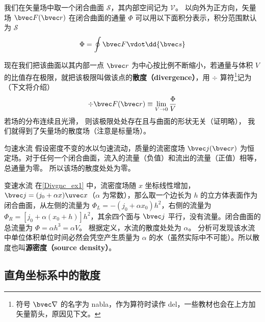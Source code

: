 

我们在矢量场中取一个闭合曲面 $\mathcal{S}$，其内部空间记为 $\mathcal{V}$。 以向外为正方向，矢量场 $\bvec F(\bvec r)$ 在闭合曲面的通量 $\Phi$ 可以用以下面积分表示，积分范围默认为 $\mathcal{S}$
\begin{equation}\label{Divgnc_eq1}
\Phi  = \oint \bvec F \vdot \dd{\bvec s}
\end{equation}

现在我们把该曲面以其内部一点 $\bvec r$ 为中心按比例不断缩小，若通量与体积 $V$ 的比值存在极限，就把该极限叫做该点的\textbf{散度（divergence）}，用 $\div$ 算符\footnote{符号 $\bvec\nabla$ 的名字为 nabla，作为算符时读作 del，一些教材也会在上方加矢量箭头，原因见下文。}记为（下文将介绍）
\begin{equation}\label{Divgnc_eq2}
\div \bvec F(\bvec r) \equiv \lim_{V \to 0} \frac{\Phi }{V}
\end{equation}
若场的分布连续且光滑， 则该极限处处存在且与曲面的形状无关（证明略）， 我们就得到了矢量场的散度场（注意是标量场）。

\begin{example}{匀速水流}\label{Divgnc_ex1}
假设密度不变的水以匀速流动，质量的流密度场 $\bvec j(\bvec r)$ 为恒定场。对于任何一个闭合曲面，流入的流量（负值）和流出的流量（正值）相等，总通量为零。 所以该场的散度处处为零。
\end{example}

\begin{example}{变速水流}
在\autoref{Divgnc_ex1} 中，流密度场随 $x$ 坐标线性增加， $\bvec j = (j_0 + \alpha x)\uvec x$（$\alpha$ 为常数），那么取一个边长为 $h$ 的立方体表面作为闭合曲面，从左侧的流量为 $\Phi_L =  - (j_0 + \alpha x_0) h^2$，右侧的流量为 $\Phi_R = [j_0 + \alpha (x_0 + h)] h^2$，其余四个面与 $\bvec j$ 平行，没有流量。闭合曲面的总流量为 $\Phi  = \alpha h^3 = \alpha V$。 根据定义，水流的散度处处为 $\alpha$。 分析可发现该水流中单位体积单位时间必然会凭空产生质量为 $\alpha$ 的水（虽然实际中不可能）。所以散度也叫\textbf{源密度（source density）}。
\end{example}

\subsection{直角坐标系中的散度}

